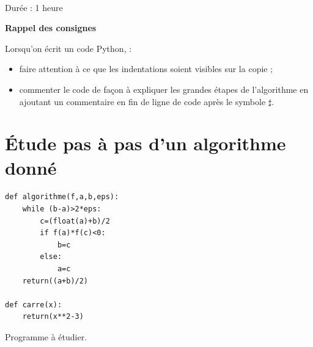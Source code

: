 
\parindent=10pt
\textheight 250mm

  \pagestyle{fancy}



 \begin{center}
  \begin{large}
  \\
  \vspace{0.5cm}
  Durée : 1 heure
  \end{large}
 \end{center}

\begin{boxedminipage}{\textwidth} 
\begin{center}
\textbf{Rappel des consignes}
\end{center}
Lorsqu'on écrit un code Python, :
\begin{itemize}
\item faire attention à ce que les indentations soient visibles sur la copie ;
\item commenter le code de façon à expliquer les grandes étapes de l'algorithme en ajoutant un commentaire en fin de ligne de code après le symbole $\sharp$.
\end{itemize}
\end{boxedminipage}
 
\section{Étude pas à pas d'un algorithme donné}

\begin{listing}
\begin{verbatim}
def algorithme(f,a,b,eps):
    while (b-a)>2*eps:
        c=(float(a)+b)/2
        if f(a)*f(c)<0:
            b=c
        else:
            a=c
    return((a+b)/2)
    
def carre(x):
    return(x**2-3)   
\end{verbatim}
\caption{Programme à étudier.}
\label{prog:dichotomie}
\end{listing}

